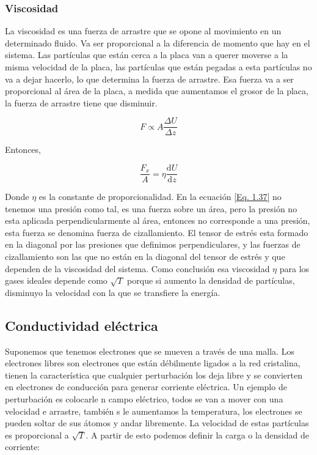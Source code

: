 \documentclass[11pt,fleqn]{book}
\begin{document}
\subsubsection{Viscosidad}

La viscosidad es una fuerza de arrastre que se opone al movimiento en un determinado fluido. Va ser proporcional a la diferencia de momento que hay en el sistema. Las partículas que están cerca a la placa van a querer moverse a la misma velocidad de la placa, las partículas que están pegadas a esta partículas no va a dejar hacerlo, lo que determina la fuerza de arrastre. Esa fuerza va a ser proporcional al área de la placa, a medida que aumentamos el grosor de la placa, la fuerza de arrastre tiene que disminuir.

\begin{equation*}
    F\propto A\frac{\Delta U}{\Delta z}
\end{equation*}

Entonces,

\begin{equation}
    \frac{F_{x}}{A}=\eta\frac{\mathrm{d}U}{\mathrm{d}z}
    \label{Eq. 1.37}
\end{equation}

Donde $\eta$ es la constante de proporcionalidad. En la ecuación \ref{Eq. 1.37} no tenemos una presión como tal, es una fuerza sobre un área, pero la presión no esta aplicada perpendicularmente al área, entonces no corresponde a una presión, esta fuerza se denomina fuerza de cizallamiento. El tensor de estrés esta formado en la diagonal por las presiones que definimos perpendiculares, y las fuerzas de cizallamiento son las que no están en la diagonal del tensor de estrés y que dependen de la viscosidad del sistema. Como conclusión esa viscosidad $\eta$ para los gases ideales depende como $\sqrt{T}$ porque si aumento la densidad de partículas, disminuyo la velocidad con la que se transfiere la energía.

\subsection{Conductividad eléctrica}

Suponemos que tenemos electrones que se mueven a través de una malla. Los electrones libres son electrones que están débilmente ligados a la red cristalina, tienen la característica que cualquier perturbación los deja libre y se convierten en electrones de conducción para generar corriente eléctrica. Un ejemplo de perturbación es colocarle n campo eléctrico, todos se van a mover con una velocidad e arrastre, también s le aumentamos la temperatura, los electrones se pueden soltar de sus átomos y andar libremente. La velocidad de estas partículas es proporcional a $\sqrt{T}$. A partir de esto podemos definir la carga o la densidad de corriente:
\end{document}
